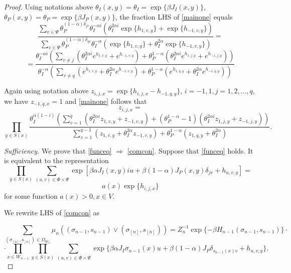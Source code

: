 \documentclass[sn-mathphys]{sn-jnl}%
\theoremstyle{thmstyleone}%
\theoremstyle{thmstyletwo}%
\theoremstyle{thmstylethree}%
\begin{document}
\begin{proof}
Using notations above $\theta_{I}(x,y)=\theta_{I}=\exp\{\beta J_{I}(x,y)\}$, $\theta_{P}(x,y)=\theta_{P}=\exp\{\beta J_{P}(x,y)\}$, the fraction LHS of \eqref{mainone} equals
$$\frac{\sum\limits_{v\in \Psi}\theta_{P}^{(1-\alpha)\delta_{jv}}\theta_{I}^{-\alpha i}\left(\theta_{I}^{2\alpha i}\exp\{h_{1,v,y}\}+\exp\{h_{-1,v,y}\} \right)}{\sum\limits_{v\in \Psi}\theta_{P}^{(1-\alpha)\delta_{qv} }\theta_{I}^{-\alpha }\left( \exp\{ h_{1,v,y}\}+ \theta_{I}^{2\alpha }\exp\{h_{-1,v,y}\} \right)}
=$$
$$=\frac{\theta_{I}^{-\alpha i}\left(\sum\limits_{v\neq j}\left(\theta_{I}^{2\alpha i}e^{h_{1,v,y}}+e^{h_{-1,v,y}} \right)+\theta_{P}^{1-\alpha} \left(\theta_{I}^{2\alpha i}e^{h_{1,j,y}}+e^{h_{-1,j,y}}\right)\right)}{\theta_{I}^{-\alpha}\left(\sum\limits_{v\neq q}\left(e^{h_{1,v,y}}+\theta_{I}^{2\alpha}e^{h_{-1,v,y}} \right)+\theta_{P}^{1-\alpha}\left(e^{h_{1,q,y}}+\theta_{I}^{2\alpha}e^{h_{-1,q,y}}\right)\right) }$$

Again using notation above $z_{i,j,x}=\exp\{h_{i,j,x}-h_{-1,q,y}\}$, $i=-1,1, j=1,2,...,q$, we have  $z_{-1,q,x}=1$ and
\eqref{mainone} follows that
$$z_{i,j,x}=$$
$$
\prod\limits_{y\in S(x)}\frac{\theta_{I}^{\alpha (1-i)}\left(\sum\limits_{v=1}^{q}\left(\theta_{I}^{2\alpha i}z_{1,v,y}+z_{-1,v,y} \right)+\left(\theta_{P}^{1-\alpha}-1\right)\left(\theta_{I}^{2\alpha i}z_{1,j,y}+z_{-1,j,y}\right)\right) }{\sum\limits_{v=1}^{q-1}\left(z_{1,v,y}+\theta_{I}^{2\alpha }z_{-1,v,y} \right)+\theta_{P}^{1-\alpha}\left(z_{1,q,y}+\theta_{I}^{2\alpha }\right)}.
$$

\emph{Sufficiency.} We prove that \eqref{funceq} $\Rightarrow$ \eqref{comcon}. Suppose that \eqref{funceq} holds. It is equivalent to the representation
$$\prod\limits_{y\in S(x)}\sum\limits_{(u,v)\in \Phi\times\Psi}\exp\left[\beta \alpha  J_{I}(x,y)iu
+\beta (1-\alpha) J_{P}(x,y)\delta_{jv}+ h_{u,v,y}\right]=$$
\begin{equation}\label{cc9}
a(x)\exp\{h_{i,j,x}\}
\end{equation}
for some function $a(x)>0, x\in V$.

We rewrite LHS of \eqref{comcon} as

$$\sum\limits_{(\sigma_{[n]}, s_{[n]})  \in {\Omega _{{W_n}}}} \mu_{n}((\sigma_{n-1}, s_{n-1}) \vee (\sigma_{[n]}, s_{[n]})) =Z_n^{-1}\exp\{-\beta H_{n-1}(\sigma_{n-1},s_{n-1})\}\cdot$$
\begin{equation}\label{cc12}
\cdot\prod_{x\in W_{n-1}}\prod_{y\in S(x)}\sum\limits_{(u,v)\in \Phi\times\Psi}\exp\{\beta \alpha  J_{I}\sigma_{n-1}(x)u
+\beta (1-\alpha) J_{P}\delta_{s_{n-1}(x)v}+ h_{u,v,y}\}.
\end{equation}


\end{proof}
\end{document}
